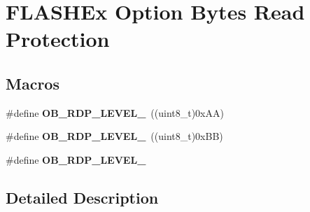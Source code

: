 \hypertarget{group___f_l_a_s_h_ex___option___bytes___read___protection}{\section{F\-L\-A\-S\-H\-Ex Option Bytes Read Protection}
\label{group___f_l_a_s_h_ex___option___bytes___read___protection}
}
\subsection*{Macros}
\begin{DoxyCompactItemize}
\item 
\hypertarget{group___f_l_a_s_h_ex___option___bytes___read___protection_ga22c7871bda267a2844ab9ca9f7bd38e4}{\#define {\bfseries O\-B\-\_\-\-R\-D\-P\-\_\-\-L\-E\-V\-E\-L\-\_}~((uint8\-\_\-t)0x\-A\-A)}\label{group___f_l_a_s_h_ex___option___bytes___read___protection_ga22c7871bda267a2844ab9ca9f7bd38e4}

\item 
\hypertarget{group___f_l_a_s_h_ex___option___bytes___read___protection_ga778207f0d12d87bbff9d55e985aba5bc}{\#define {\bfseries O\-B\-\_\-\-R\-D\-P\-\_\-\-L\-E\-V\-E\-L\-\_}~((uint8\-\_\-t)0x\-B\-B)}\label{group___f_l_a_s_h_ex___option___bytes___read___protection_ga778207f0d12d87bbff9d55e985aba5bc}

\item 
\#define {\bfseries O\-B\-\_\-\-R\-D\-P\-\_\-\-L\-E\-V\-E\-L\-\_}
\end{DoxyCompactItemize}


\subsection{Detailed Description}


